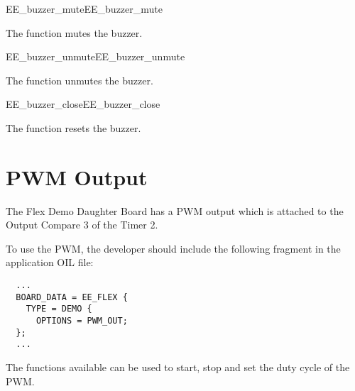 \begin{function_nopb2}{EE\_buzzer\_mute}{EE_buzzer_mute}
  
  \begin{fundescription}
    The function mutes the buzzer.
  \end{fundescription}
\end{function_nopb2}

\begin{function_nopb2}{EE\_buzzer\_unmute}{EE_buzzer_unmute}
  
  \begin{fundescription}
    The function unmutes the buzzer.
  \end{fundescription}
\end{function_nopb2}

\begin{function_nopb2}{EE\_buzzer\_close}{EE_buzzer_close}
  
  \begin{fundescription}
    The function resets the buzzer.
  \end{fundescription}
\end{function_nopb2}



\section{PWM Output}

The Flex Demo Daughter Board has a PWM output which is attached to the
Output Compare 3 of the Timer 2. %

To use the PWM, the developer should
include the following fragment in the application OIL file:

\begin{lstlisting}
  ...
  BOARD_DATA = EE_FLEX {
    TYPE = DEMO {
      OPTIONS = PWM_OUT;
  };
  ...
\end{lstlisting}

The functions available can be used to start, stop and set the duty
cycle of the PWM.



